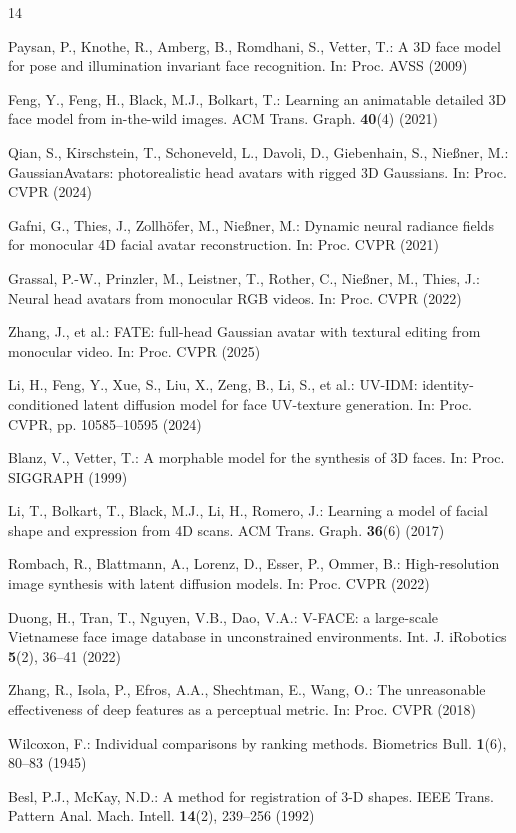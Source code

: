 \documentclass[runningheads]{llncs}
\begin{document}
\begin{thebibliography}{14}

Paysan, P., Knothe, R., Amberg, B., Romdhani, S., Vetter, T.: A 3D face model
for pose and illumination invariant face recognition. In: Proc. AVSS (2009)

Feng, Y., Feng, H., Black, M.J., Bolkart, T.: Learning an animatable detailed
3D face model from in-the-wild images. ACM Trans. Graph. \textbf{40}(4) (2021)

Qian, S., Kirschstein, T., Schoneveld, L., Davoli, D., Giebenhain, S.,
Nie{\ss}ner, M.: GaussianAvatars: photorealistic head avatars with rigged 3D
Gaussians. In: Proc. CVPR (2024)

Gafni, G., Thies, J., Zollh\"ofer, M., Nie{\ss}ner, M.: Dynamic neural radiance
fields for monocular 4D facial avatar reconstruction. In: Proc. CVPR (2021)

Grassal, P.-W., Prinzler, M., Leistner, T., Rother, C., Nie{\ss}ner, M.,
Thies, J.: Neural head avatars from monocular RGB videos. In: Proc. CVPR (2022)

Zhang, J., et al.: FATE: full-head Gaussian avatar with textural editing from
monocular video. In: Proc. CVPR (2025)

Li, H., Feng, Y., Xue, S., Liu, X., Zeng, B., Li, S., et al.: UV-IDM:
identity-conditioned latent diffusion model for face UV-texture generation.
In: Proc. CVPR, pp. 10585--10595 (2024)

Blanz, V., Vetter, T.: A morphable model for the synthesis of 3D faces.
In: Proc. SIGGRAPH (1999)

Li, T., Bolkart, T., Black, M.J., Li, H., Romero, J.: Learning a model of
facial shape and expression from 4D scans. ACM Trans. Graph. \textbf{36}(6)
(2017)

Rombach, R., Blattmann, A., Lorenz, D., Esser, P., Ommer, B.: High-resolution
image synthesis with latent diffusion models. In: Proc. CVPR (2022)

Duong, H., Tran, T., Nguyen, V.B., Dao, V.A.: V-FACE: a large-scale Vietnamese
face image database in unconstrained environments. Int. J. iRobotics
\textbf{5}(2), 36--41 (2022)

Zhang, R., Isola, P., Efros, A.A., Shechtman, E., Wang, O.: The unreasonable
effectiveness of deep features as a perceptual metric. In: Proc. CVPR (2018)

Wilcoxon, F.: Individual comparisons by ranking methods. Biometrics Bull.
\textbf{1}(6), 80--83 (1945)

Besl, P.J., McKay, N.D.: A method for registration of 3-D shapes. IEEE Trans.
Pattern Anal. Mach. Intell. \textbf{14}(2), 239--256 (1992)

\end{thebibliography}
\end{document}
